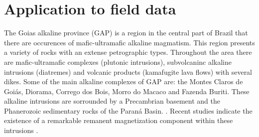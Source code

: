 \section{Application to field data}
\label{sec:real_application}

The Goias alkaline province (GAP) is a region in the central part of Brazil that there are occurences of mafic-ultramafic alkaline magmatism. This region presents a variety of rocks with an extense petrographic types. Throughout the area there are mafic-ultramafic complexes (plutonic intrusions), subvolcaninc alkaline intrusions (diatremes) and volcanic products (kamafugite lava flows) with several dikes. Some of the main alkaline complexes of GAP are: the Montes Claros de Goi\'as, Diorama, Corrego dos Bois, Morro do Macaco and Fazenda Buriti. These alkaline intrusions are sorrounded by a Precambrian basement and the Phanerozoic sedimentary rocks of the Paran\'a Basin. \citep{junqueira_brod_2005,carlson_etal_2007,marangoni_mantovani_2013,dutra_etal_2014}. Recent studies indicate the existence of a remarkable remanent magnetization component within these intrusions \citep{marangoni_mantovani_2013,oliveirajr_etal_2015,marangoni_etal_2016,zhang_etal_2018}. 

